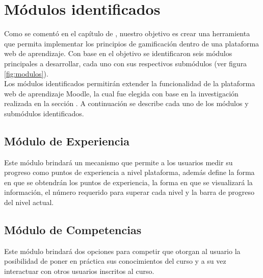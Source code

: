 
\section{Módulos identificados}
\label{analisis:modulos}

 Como se comentó en el capítulo de , nuestro
 objetivo es crear una herramienta que permita implementar los principios de
 gamificación dentro de una plataforma web de aprendizaje. Con base en el objetivo
 se identificaron seis módulos principales a desarrollar, cada uno con sus
 respectivos submódulos (ver figura \ref{fig:modulos}).\\

 \noindent
 Los módulos identificados permitirán extender la funcionalidad de la plataforma web
 de aprendizaje Moodle, la cual fue elegida con base en la investigación realizada en
 la sección . A continuación se describe cada uno de los módulos y
 submódulos identificados.\\







\subsection*{Módulo de Experiencia}

 \noindent
 Este módulo brindará un mecanismo que permite a los usuarios medir su progreso
 como puntos de experiencia a nivel plataforma, además define la forma en que se
 obtendrán los puntos de experiencia, la forma en que se visualizará la información,
 el número requerido para superar cada nivel y la barra de progreso del nivel
 actual.

\subsection*{Módulo de Competencias}

 \noindent 
 Este módulo brindará dos opciones para competir que otorgan al usuario
 la posibilidad de poner en práctica sus conocimientos del curso y a su vez
 interactuar con otros usuarios inscritos al curso.

